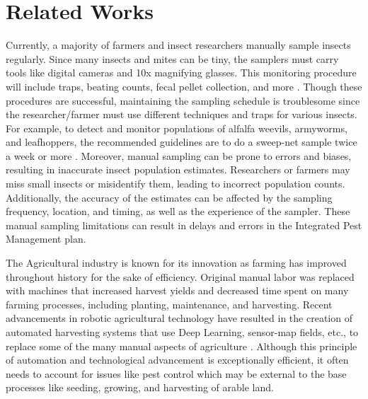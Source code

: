 
\chapter{Related Works}
Currently, a majority of farmers and insect researchers manually sample insects regularly. Since many insects and mites can be tiny, the samplers must carry tools like digital cameras and 10x magnifying glasses. This monitoring procedure will include traps, beating counts, fecal pellet collection, and more \cite{pinkston}. Though these procedures are successful, maintaining the sampling schedule is troublesome since the researcher/farmer must use different techniques and traps for various insects. For example, to detect and monitor populations of alfalfa weevils, armyworms, and leafhoppers, the recommended guidelines are to do a sweep-net sample twice a week or more \cite{long_goodell_2017}. Moreover, manual sampling can be prone to errors and biases, resulting in inaccurate insect population estimates. Researchers or farmers may miss small insects or misidentify them, leading to incorrect population counts. Additionally, the accuracy of the estimates can be affected by the sampling frequency, location, and timing, as well as the experience of the sampler. These manual sampling limitations can result in delays and errors in the Integrated Pest Management plan.

The Agricultural industry is known for its innovation as farming has improved throughout history for the sake of efficiency. Original manual labor was replaced with machines that increased harvest yields and decreased time spent on many farming processes, including planting, maintenance, and harvesting. Recent advancements in robotic agricultural technology have resulted in the creation of automated harvesting systems that use Deep Learning, sensor-map fields, etc., to replace some of the many manual aspects of agriculture \cite{magee_2020}. Although this principle of automation and technological advancement is exceptionally efficient, it often needs to account for issues like pest control which may be external to the base processes like seeding, growing, and harvesting of arable land.

